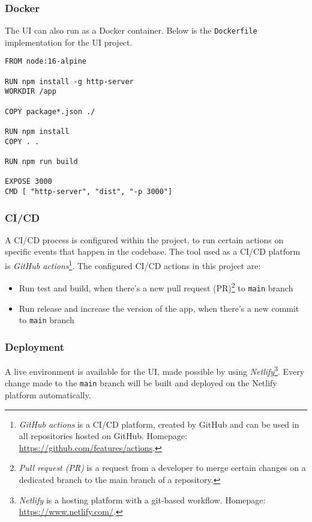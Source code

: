   \subsubsection{Docker}
  The UI can also run as a Docker container. Below is the \verb;Dockerfile; implementation for the UI project. 

  \begin{lstlisting}[caption={Dockerfile for FDS (Docker)}, language=docker]
FROM node:16-alpine

RUN npm install -g http-server
WORKDIR /app

COPY package*.json ./

RUN npm install
COPY . .

RUN npm run build

EXPOSE 3000
CMD [ "http-server", "dist", "-p 3000"]
      \end{lstlisting}

  \subsubsection{CI/CD}
  A CI/CD process is configured within the project, to run certain actions on specific events that happen in the codebase. The tool used as a CI/CD platform is \emph{GitHub actions}\footnote{\emph{GitHub actions} is a CI/CD platform, created by GitHub and can be used in all repositories hosted on GitHub. Homepage: \url{https://github.com/features/actions}.}. The configured CI/CD actions in this project are:

   \begin{itemize}
    \item Run test and build, when there's a new pull request (PR)\footnote{\emph{Pull request (PR)} is a request from a developer to merge certain changes on a dedicated branch to the main branch of a repository.} to \verb;main; branch
    \item Run release and increase the version of the app, when there's a new commit to \verb;main; branch
   \end{itemize}
  
  \subsubsection{Deployment}
  A live environment is available for the UI, made possible by using \emph{Netlify}\footnote{\emph{Netlify} is a hosting platform with a git-based workflow. Homepage: \url{https://www.netlify.com/}.}. Every change made to the \verb;main; branch will be built and deployed on the Netlify platform automatically. 

